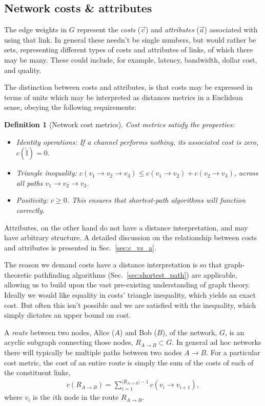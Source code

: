 \documentclass[aps,rmp,twocolumn,amsmath,amssymb,nofootinbib,superscriptaddress,longbibliography,floatfix]{revtex4-1}
\newtheorem{definition}{Definition}
\begin{document}
%
%

\subsection{Network costs \& attributes} \label{sec:costs}

The edge weights in $G$ represent the \emph{costs} ($\vec c$) and \emph{attributes} ($\vec a$) associated with using that link. In general these needn't be single numbers, but would rather be sets, representing different types of costs and attributes of links, of which there may be many. These could include, for example, latency, bandwidth, dollar cost, and quality.

The distinction between costs and attributes, is that costs may be expressed in terms of units which may be interpreted as distances metrics in a Euclidean sense, obeying the following requirements:

\begin{definition}[Network cost metrics] \label{def:metric} Cost metrics satisfy the properties:
\begin{itemize}
    \item Identity operations: If a channel performs nothing, its associated cost is zero, \mbox{$c(\mathbb{\hat{I}}) = 0$}.
    \item Triangle inequality: $c(v_1\to v_2\to v_3) \leq c(v_1\to v_2) + c(v_2\to v_3)$, across all paths \mbox{$v_1 \to v_2 \to v_3$}.
    \item Positivity: \mbox{$c\geq 0$}. This ensures that shortest-path algorithms will function correctly.
\end{itemize}
\end{definition}
Attributes, on the other hand do not have a distance interpretation, and may have arbitrary structure. A detailed discussion on the relationship between costs and attributes is presented in Sec.~\ref{sec:c_vs_a}.

The reason we demand costs have a distance interpretation is so that graph-theoretic pathfinding algorithms (Sec.~\ref{sec:shortest_path}) are applicable, allowing us to build upon the vast pre-existing understanding of graph theory. Ideally we would like equality in costs' triangle inequality, which yields an exact cost. But often this isn't possible and we are satisfied with the inequality, which simply dictates an upper bound on cost.

A \emph{route} between two nodes, Alice ($A$) and Bob ($B$), of the network, $G$, is an acyclic subgraph connecting those nodes, \mbox{$R_{A\to B}\subset G$}. In general ad hoc networks there will typically be multiple paths between two nodes \mbox{$A\to B$}. For a particular cost metric, the cost of an entire route is simply the sum of the costs of each of the constituent links,
\begin{align}
c(R_{A\to B}) = \sum_{i=1}^{|R_{A\to B}|-1} c(v_i \to v_{i+1}),
\end{align}
where $v_i$ is the $i$th node in the route $R_{A\to B}$.
\end{document}
